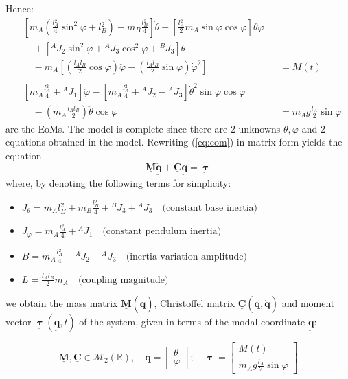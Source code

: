 \documentclass[12pt]{article}
\newcommand{\vb}[1]{{\underset{\tilde{}}{\mathbf{#1}}}}
\newcommand{\mb}[1]{\underline{\mathbf{#1}}}
\begin{document}
\vspace{0.5cm}
Hence:
\begin{equation}
    \begin{aligned}
    &\left[ m{}_A \left(\frac{l{}_A^2}{4}\sin^2\varphi + l{}_B^2\right) + m{}_B \frac{l{}_B^2}{4} \right] \ddot{\theta} + \left[ \frac{l{}_A^2}{2} m{}_A \sin\varphi\cos\varphi \right] \dot{\theta}\dot{\varphi} \\
    &\quad + \left[ {}^A J{}_2 \sin^2\varphi + {}^A J{}_3 \cos^2\varphi + {}^B J{}_3 \right]\ddot{\theta} \\
    &\quad - m{}_A \left[ \left(\frac{l{}_A l{}_B}{2}\cos\varphi\right)\ddot{\varphi} - \left(\frac{l{}_A l{}_B}{2}\sin\varphi\right)\dot{\varphi}^2 \right] & &= M(t) \\
    \\
    &\left[ m{}_A \frac{l{}_A^2}{4} + {}^A J{}_1 \right] \ddot{\varphi} - \left[ m{}_A \frac{l{}_A^2}{4} + {}^A J{}_2 - {}^A J{}_3 \right] \dot{\theta}^2\sin\varphi\cos\varphi \\ &\quad - \left(m{}_A \frac{l{}_A l{}_B}{2}\right)\ddot{\theta}\cos\varphi & &=  m{}_A g \frac{l{}_A}{2} \sin\varphi
\end{aligned} 
\label{eq:eom}
\end{equation}
are the EoMs. The model is complete since there are 2 unknowns $\theta, \varphi$ and 2 equations obtained in the model. Rewriting (\ref{eq:eom}) in matrix form yields the equation 
$$ \mb{M} \ddot{\vb{q}} + \mb{C} \dot{\vb{q}} = \vb{\boldsymbol{\uptau}}$$
where, by denoting the following terms for simplicity: 
\begin{itemize}
    \item[] $J{}_\theta = m{}_A l{}_B^2 + m{}_B \frac{l{}_B^2}{4} + {}^B J{}_3 + {}^A J{}_3 \quad \text{(constant base inertia)}$
    \item[] $J{}_\varphi = m{}_A \frac{l{}_A^2}{4} + {}^A J{}_1 \quad \text{(constant pendulum inertia)}$
    \item[] $B = m{}_A \frac{l{}_A^2}{4} + {}^A J{}_2 - {}^A J{}_3 \quad \text{(inertia variation amplitude)}$
    \item[] $L = \frac{l{}_A l{}_B}{2} m{}_A \quad \text{(coupling magnitude)}$
\end{itemize}
we obtain the mass matrix $\mb{M}(\vb{q})$, Christoffel matrix $\mb{C}(\vb{q}, \dot{\vb{q}})$ and moment vector $\vb{\boldsymbol{\uptau}}(\vb{q}, t)$ of the system, given in terms of the modal coordinate $\vb{q}$:

$$\mb{M}, \mb{C} \in \mathcal{M}{}_2(\mathbb{R}), \quad \vb{q} = \begin{bmatrix} \theta \\ \varphi \end{bmatrix} ; \quad \boldsymbol{\uptau} = \begin{bmatrix} M(t) \\  m{}_A g \frac{l{}_A}{2} \sin\varphi \end{bmatrix} $$
\end{document}
